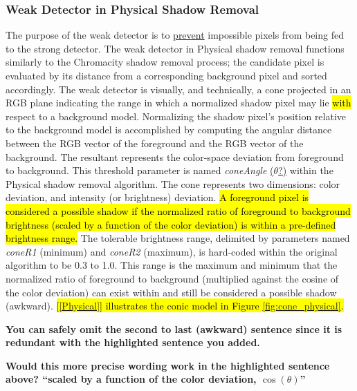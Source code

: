 \documentclass[12pt]{report}
\newcommand{\comment}[1]
           {\par {\bfseries \color{blue} #1 \par}}
\begin{document}
\subsubsection{Weak Detector in Physical Shadow Removal}

The purpose of the weak detector is to \underline{prevent} impossible pixels from being fed to the strong detector. The weak detector in Physical shadow removal functions similarly to the Chromacity shadow removal process; the candidate pixel is evaluated by its distance from a corresponding background pixel and sorted accordingly. The weak detector is visually, and technically, a cone projected in an RGB plane indicating the range in which a normalized shadow pixel may lie \hl{with} respect to a background model. Normalizing the shadow pixel's position relative to the background model is accomplished by computing the angular distance between the RGB vector of the foreground and the RGB vector of the background. The resultant represents the color-space deviation from foreground to background. This threshold parameter is named \textit{coneAngle} \underline{($\theta$?)} within the Physical shadow removal algorithm. The cone represents two dimensions: color deviation, and intensity (or brightness) deviation. \hl{A foreground pixel is considered a possible shadow if the normalized ratio of foreground to background brightness (scaled by a function of the color deviation) is within a pre-defined brightness range.} The tolerable brightness range, delimited by parameters named \textit{coneR1} (minimum) and \textit{coneR2} (maximum), is hard-coded within the original algorithm to be 0.3 to 1.0. This range is the maximum and minimum that the normalized ratio of foreground to background (multiplied against the cosine of the color deviation) can exist within and still be considered a possible shadow (awkward). \hl{[\ref{Physical}] illustrates the conic model in Figure \ref{fig:cone_physical}.}
\comment{You can safely omit the second to last (awkward) sentence since it is redundant with the highlighted sentence you added.}
\comment{Would this more precise wording work in the highlighted sentence above? ``scaled by a function of the color deviation, $\cos(\theta)$''}
\end{document}
